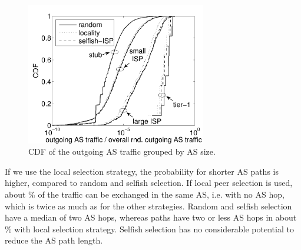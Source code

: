 \begin{figure}[bt]
	\centering
	\includegraphics[width=0.7\textwidth]{aslevel/p2p/results/figs/outgoing_CDF}
 	\caption{CDF of the outgoing AS traffic grouped by AS size.}
 	\label{fig:outgoing_CDF}
\end{figure}




If we use the local selection strategy, the probability for shorter AS paths is higher, compared to random and selfish selection. If local peer selection is used, about \unit[20]{\%} of the traffic can be exchanged in the same AS, i.e. with no AS hop, which is twice as much as for the other strategies. Random and selfish selection have a median of two AS hops, whereas paths have two or less AS hops in about \unit[80]{\%} with local selection strategy. Selfish selection has no considerable potential to reduce the AS path length.

